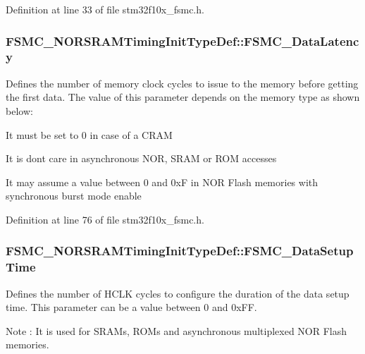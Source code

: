 Definition at line 33 of file stm32f10x\+\_\+fsmc.\+h.

\subsubsection[{\texorpdfstring{F\+S\+M\+C\+\_\+\+Data\+Latency}{FSMC_DataLatency}}]{ F\+S\+M\+C\+\_\+\+N\+O\+R\+S\+R\+A\+M\+Timing\+Init\+Type\+Def\+::\+F\+S\+M\+C\+\_\+\+Data\+Latency}\hypertarget{struct_f_s_m_c___n_o_r_s_r_a_m_timing_init_type_def_abc33886615fc3627448aa2dba11cfc77}{}\label{struct_f_s_m_c___n_o_r_s_r_a_m_timing_init_type_def_abc33886615fc3627448aa2dba11cfc77}
Defines the number of memory clock cycles to issue to the memory before getting the first data. The value of this parameter depends on the memory type as shown below\+:
\begin{DoxyItemize}
\item It must be set to 0 in case of a C\+R\+AM
\item It is don\textquotesingle{}t care in asynchronous N\+OR, S\+R\+AM or R\+OM accesses
\item It may assume a value between 0 and 0xF in N\+OR Flash memories with synchronous burst mode enable 
\end{DoxyItemize}

Definition at line 76 of file stm32f10x\+\_\+fsmc.\+h.

\subsubsection[{\texorpdfstring{F\+S\+M\+C\+\_\+\+Data\+Setup\+Time}{FSMC_DataSetupTime}}]{ F\+S\+M\+C\+\_\+\+N\+O\+R\+S\+R\+A\+M\+Timing\+Init\+Type\+Def\+::\+F\+S\+M\+C\+\_\+\+Data\+Setup\+Time}\hypertarget{struct_f_s_m_c___n_o_r_s_r_a_m_timing_init_type_def_a44195e51b8b2b74d70c354daea11027f}{}\label{struct_f_s_m_c___n_o_r_s_r_a_m_timing_init_type_def_a44195e51b8b2b74d70c354daea11027f}
Defines the number of H\+C\+LK cycles to configure the duration of the data setup time. This parameter can be a value between 0 and 0x\+FF. \begin{DoxyNote}{Note}
\+: It is used for S\+R\+A\+Ms, R\+O\+Ms and asynchronous multiplexed N\+OR Flash memories. 
\end{DoxyNote}


